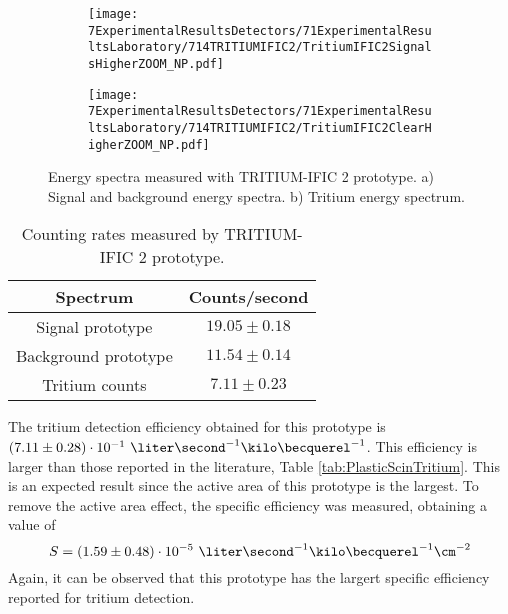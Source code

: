 \begin{figure}
\centering
    \begin{subfigure}[b]{0.73\textwidth}
    \centering
    \texttt{[image: 7ExperimentalResultsDetectors/71ExperimentalResultsLaboratory/714TRITIUMIFIC2/TritiumIFIC2SignalsHigherZOOM\_NP.pdf]}  
    \caption{\label{subfig:SignalBackgroundEnergySpectraTritiumIFIC2}}
    \end{subfigure}
    \hfill
    \begin{subfigure}[b]{0.73\textwidth}
    \centering
    \texttt{[image: 7ExperimentalResultsDetectors/71ExperimentalResultsLaboratory/714TRITIUMIFIC2/TritiumIFIC2ClearHigherZOOM\_NP.pdf]}  
    \caption{\label{subfig:TritiumEnergySpectraTritiumIFIC2}}
    \end{subfigure}
 \caption{Energy spectra measured with TRITIUM-IFIC 2 prototype. a) Signal and background energy spectra. b) Tritium energy spectrum.}
 \label{fig:EnergySpectraTRITIUMIFIC2}
\end{figure}

\begin{table}[htbp]
\centering{}%
\begin{tabular}{cc}
\toprule 
Spectrum & Counts/second \tabularnewline
\midrule
\midrule 
Signal prototype & $19.05 \pm 0.18$ \tabularnewline
Background prototype & $11.54 \pm 0.14$ \tabularnewline  
Tritium counts & $7.11 \pm 0.23$ \tabularnewline
\bottomrule
\end{tabular}
\caption{Counting rates measured by TRITIUM-IFIC 2 prototype.}
\label{tab:CountsPerSecondTRITIUMIFIC2}
\end{table}
The tritium detection efficiency obtained for this prototype is $(7.11 \pm 0.28)\cdot{} 10^{-1}~\liter\second^{-1}\kilo\becquerel^{-1}$. This efficiency is larger than those reported in the literature, Table \ref{tab:PlasticScinTritium}. This is an expected result since the active area of this prototype is the largest. To remove the active area effect, the specific efficiency was measured, obtaining a value of 
$$S=(1.59 \pm 0.48)\cdot{} 10^{-5}~\liter\second^{-1}\kilo\becquerel^{-1}\cm^{-2}$$
Again, it can be observed that this prototype has the largert specific efficiency reported for tritium detection.

